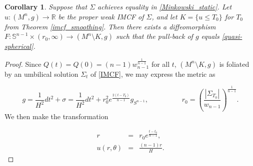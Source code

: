 \documentclass[12pt,twoside]{article}
\theoremstyle{plain}
\newtheorem{cor}[theorem]{Corollary}
\theoremstyle{definition}
\theoremstyle{remark}
\numberwithin{equation}{section}
\begin{document}
\begin{cor} \label{cor}
Suppose that $\Sigma$ achieves equality in \eqref{Minkowski_static}. Let $u: (M^{n},g) \rightarrow \mathbb{R}$ be the proper weak IMCF of $\Sigma$, and let $K= \{ u \leq T_{0} \}$ for $T_{0}$ from Theorem \ref{imcf_smoothing}. Then there exists a diffeomorphism $F: \mathbb{S}^{n-1} \times (r_{0},\infty) \rightarrow (M^{n} \setminus K,g)$ such that the pull-back of $g$ equals \eqref{quasi-spherical}.
\end{cor}
\begin{proof}
Since $Q(t)=Q(0)=(n-1)w_{n-1}^{\frac{1}{n-1}}$ for all $t$, $(M^{n} \setminus K, g)$ is foliated by an umbilical solution $\Sigma_{t}$ of \eqref{IMCF}, we may express the metric as

\begin{equation*}
g= \frac{1}{H^{2}} dt^{2} + \sigma = \frac{1}{H^{2}} dt^{2} + r_{0}^{2}e^{\frac{2(t-T_{0})}{n-1}} g_{S^{n-1}}, \hspace{2cm} r_{0}= \left( \frac{|\Sigma_{T_{0}}|}{w_{n-1}} \right)^{\frac{1}{n-1}}.
\end{equation*}
We then make the transformation

\begin{eqnarray*}
r &=& r_{0} e^{\frac{t-t_{0}}{n-1}}, \\
u(r,\theta) &=& \frac{(n-1)r}{H}.
\end{eqnarray*}
\end{proof}
\end{document}
